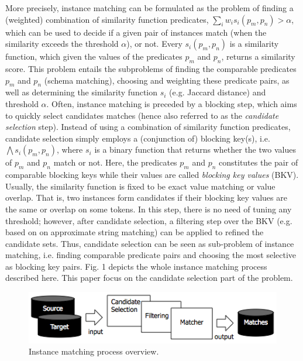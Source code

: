 More precisely, instance matching can be formulated as the problem of finding a (weighted) combination of similarity function predicates, $\sum_i{w_i s_i(p_m,p_n)} > \alpha$, which can be used to decide if a given pair of instances match (when the similarity exceeds the threshold $\alpha$), or not. Every $s_i(p_m,p_n)$ is a similarity function, which given the values of the predicates $p_m$ and $p_n$, returns a similarity score. This problem entails the subproblems of finding the comparable predicates $p_m$ and $p_n$ (schema matching), choosing and weighting these predicate pairs, as well as determining the similarity function $s_i$ (e.g. Jaccard distance) and threshold $\alpha$.  Often, instance matching is preceded by a blocking step, which aims to quickly select candidates matches (hence also referred to as the \emph{candidate selection} step). Instead of using a combination of similarity function predicates, candidate selection simply employs a (conjunction of) blocking key(s), i.e. $\bigwedge s_i(p_m,p_n)$, where $s_i$ is a binary function that returns whether the two values of $p_m$ and $p_n$ match or not. Here, the predicates $p_m$ and $p_n$ constitutes the pair of comparable blocking keys while their values are called \emph{blocking key values} (BKV). Usually, the similarity function is fixed to be exact value matching or value overlap. That is, two instances form candidates if their blocking key values are the same or overlap on some tokens. In this step, there is no need of tuning any threshold; however, after candidate selection, a filtering step over the BKV (e.g. based on on approximate string matching) can be applied to refined the candidate sets. Thus, candidate selection can be seen as sub-problem of instance matching, i.e. finding comparable predicate pairs and choosing the most selective as blocking key pairs. Fig. 1 depicts the whole instance matching process described here. This paper focus on the candidate selection part of the problem.

 \begin{figure} [ht]
 
\centering
\includegraphics[scale=0.5]{p1.png}
\caption{Instance matching process overview.} 
\vspace{-2pt}
\label{fig:space}
\end{figure}

